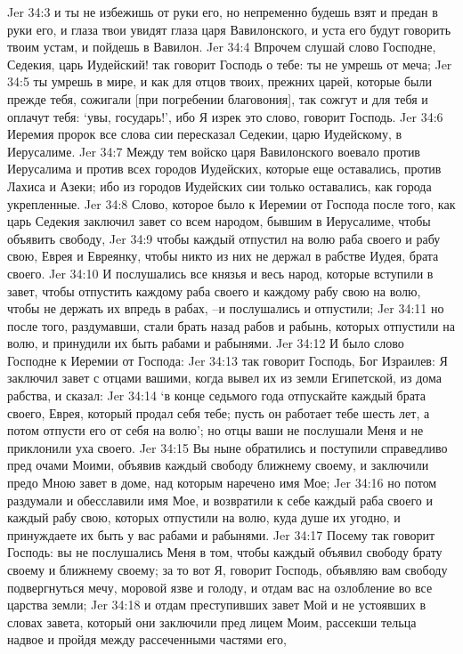 Jer 34:3  и ты не избежишь от руки его, но непременно будешь взят и предан в руки его, и глаза твои увидят глаза царя Вавилонского, и уста его будут говорить твоим устам, и пойдешь в Вавилон.
Jer 34:4  Впрочем слушай слово Господне, Седекия, царь Иудейский! так говорит Господь о тебе: ты не умрешь от меча;
Jer 34:5  ты умрешь в мире, и как для отцов твоих, прежних царей, которые были прежде тебя, сожигали [при погребении благовония], так сожгут и для тебя и оплачут тебя: `увы, государь!', ибо Я изрек это слово, говорит Господь.
Jer 34:6  Иеремия пророк все слова сии пересказал Седекии, царю Иудейскому, в Иерусалиме.
Jer 34:7  Между тем войско царя Вавилонского воевало против Иерусалима и против всех городов Иудейских, которые еще оставались, против Лахиса и Азеки; ибо из городов Иудейских сии только оставались, как города укрепленные.
Jer 34:8  Слово, которое было к Иеремии от Господа после того, как царь Седекия заключил завет со всем народом, бывшим в Иерусалиме, чтобы объявить свободу,
Jer 34:9  чтобы каждый отпустил на волю раба своего и рабу свою, Еврея и Евреянку, чтобы никто из них не держал в рабстве Иудея, брата своего.
Jer 34:10  И послушались все князья и весь народ, которые вступили в завет, чтобы отпустить каждому раба своего и каждому рабу свою на волю, чтобы не держать их впредь в рабах, --и послушались и отпустили;
Jer 34:11  но после того, раздумавши, стали брать назад рабов и рабынь, которых отпустили на волю, и принудили их быть рабами и рабынями.
Jer 34:12  И было слово Господне к Иеремии от Господа:
Jer 34:13  так говорит Господь, Бог Израилев: Я заключил завет с отцами вашими, когда вывел их из земли Египетской, из дома рабства, и сказал:
Jer 34:14  `в конце седьмого года отпускайте каждый брата своего, Еврея, который продал себя тебе; пусть он работает тебе шесть лет, а потом отпусти его от себя на волю'; но отцы ваши не послушали Меня и не приклонили уха своего.
Jer 34:15  Вы ныне обратились и поступили справедливо пред очами Моими, объявив каждый свободу ближнему своему, и заключили предо Мною завет в доме, над которым наречено имя Мое;
Jer 34:16  но потом раздумали и обесславили имя Мое, и возвратили к себе каждый раба своего и каждый рабу свою, которых отпустили на волю, куда душе их угодно, и принуждаете их быть у вас рабами и рабынями.
Jer 34:17  Посему так говорит Господь: вы не послушались Меня в том, чтобы каждый объявил свободу брату своему и ближнему своему; за то вот Я, говорит Господь, объявляю вам свободу подвергнуться мечу, моровой язве и голоду, и отдам вас на озлобление во все царства земли;
Jer 34:18  и отдам преступивших завет Мой и не устоявших в словах завета, который они заключили пред лицем Моим, рассекши тельца надвое и пройдя между рассеченными частями его,
